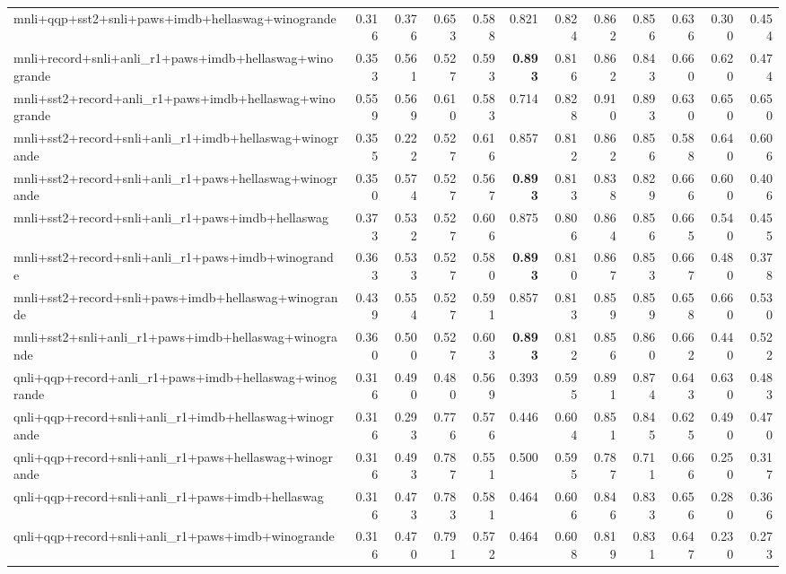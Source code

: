 \begin{table}[t]
\begin{tabular}{lrrrrrrrrrrr}
    mnli+qqp+sst2+snli+paws+imdb+hellaswag+winogrande & 0.316 & 0.376 & 0.653 & 0.588 & 0.821 & 0.824 & 0.862 & 0.856 & 0.636 & 0.300 & 0.454 \\
    mnli+record+snli+anli\_r1+paws+imdb+hellaswag+winogrande & 0.353 & 0.561 & 0.527 & 0.593 & \textbf{0.893} & 0.816 & 0.862 & 0.843 & 0.660 & 0.620 & 0.474 \\
    mnli+sst2+record+anli\_r1+paws+imdb+hellaswag+winogrande & 0.559 & 0.569 & 0.610 & 0.583 & 0.714 & 0.828 & 0.910 & 0.893 & 0.630 & 0.650 & 0.650 \\
    mnli+sst2+record+snli+anli\_r1+imdb+hellaswag+winogrande & 0.355 & 0.222 & 0.527 & 0.616 & 0.857 & 0.812 & 0.862 & 0.856 & 0.588 & 0.640 & 0.606 \\
    mnli+sst2+record+snli+anli\_r1+paws+hellaswag+winogrande & 0.350 & 0.574 & 0.527 & 0.567 & \textbf{0.893} & 0.813 & 0.838 & 0.829 & 0.666 & 0.600 & 0.406 \\
    mnli+sst2+record+snli+anli\_r1+paws+imdb+hellaswag & 0.373 & 0.532 & 0.527 & 0.606 & 0.875 & 0.806 & 0.864 & 0.856 & 0.665 & 0.540 & 0.455 \\
    mnli+sst2+record+snli+anli\_r1+paws+imdb+winogrande & 0.363 & 0.533 & 0.527 & 0.580 & \textbf{0.893} & 0.810 & 0.867 & 0.853 & 0.667 & 0.480 & 0.378 \\
    mnli+sst2+record+snli+paws+imdb+hellaswag+winogrande & 0.439 & 0.554 & 0.527 & 0.591 & 0.857 & 0.813 & 0.859 & 0.859 & 0.658 & 0.660 & 0.530 \\
    mnli+sst2+snli+anli\_r1+paws+imdb+hellaswag+winogrande & 0.360 & 0.500 & 0.527 & 0.603 & \textbf{0.893} & 0.812 & 0.856 & 0.860 & 0.662 & 0.440 & 0.522 \\
    qnli+qqp+record+anli\_r1+paws+imdb+hellaswag+winogrande & 0.316 & 0.490 & 0.480 & 0.569 & 0.393 & 0.595 & 0.891 & 0.874 & 0.643 & 0.630 & 0.483 \\
    qnli+qqp+record+snli+anli\_r1+imdb+hellaswag+winogrande & 0.316 & 0.293 & 0.776 & 0.576 & 0.446 & 0.604 & 0.851 & 0.845 & 0.625 & 0.490 & 0.470 \\
    qnli+qqp+record+snli+anli\_r1+paws+hellaswag+winogrande & 0.316 & 0.493 & 0.787 & 0.551 & 0.500 & 0.595 & 0.787 & 0.711 & 0.666 & 0.250 & 0.317 \\
    qnli+qqp+record+snli+anli\_r1+paws+imdb+hellaswag & 0.316 & 0.473 & 0.783 & 0.581 & 0.464 & 0.606 & 0.846 & 0.833 & 0.656 & 0.280 & 0.366 \\
    qnli+qqp+record+snli+anli\_r1+paws+imdb+winogrande & 0.316 & 0.470 & 0.791 & 0.572 & 0.464 & 0.608 & 0.819 & 0.831 & 0.647 & 0.230 & 0.273 \\

\end{tabular}
\end{table}
